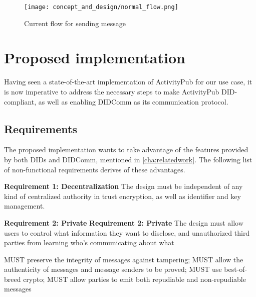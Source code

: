 \begin{figure}[H]
  \centering
  \texttt{[image: concept\_and\_design/normal\_flow.png]}
  \caption{Current flow for sending message}
  \label{fig:normal_flow}
\end{figure}

\pagebreak

\section{Proposed implementation}\label{section:did_flow}
Having seen a state-of-the-art implementation of ActivityPub for our use case, it is now imperative to address the necessary steps to make ActivityPub DID-compliant, as well as enabling DIDComm as its communication protocol. 

\subsection{Requirements}
The proposed implementation wants to take advantage of the features provided by both DIDs and DIDComm, mentioned in \autoref{cha:relatedwork}. The following list of non-functional requirements derives of these advantages. 

\textbf{Requirement 1: Decentralization}
The design must be independent of any kind of centralized authority in trust encryption, as well as identifier and key management.

\textbf{Requirement 2: Private}
\textbf{Requirement 2: Private}
The design must allow users to control what information they want to disclose, and unauthorized third parties from learning who’s communicating about what

MUST preserve the integrity of messages against tampering; MUST allow the authenticity of messages and message senders to be proved; MUST use best-of-breed crypto; MUST allow parties to emit both repudiable and non-repudiable messages

